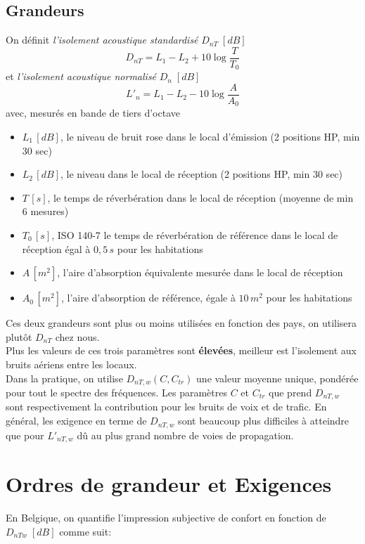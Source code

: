 \documentclass[11pt]{report}
\begin{document}
\subsection{Grandeurs}
On définit \textit{l'isolement acoustique standardisé} $D_{nT}\;[dB]$
$$D_{nT} = L_1 - L_2 + 10\log \frac{T}{T_0}$$
et \textit{l'isolement acoustique normalisé} $D_{n}\;[dB]$
$$L'_{n} = L_1 - L_2 - 10\log \frac{A}{A_0}$$
avec, mesurés en bande de tiers d'octave
\begin{itemize}
\item $L_1\,[dB]$, le niveau de bruit rose dans le local d'émission (2 positions HP, min 30 sec)
\item $L_2\,[dB]$, le niveau dans le local de réception (2 positions HP, min 30 sec)
\item $T\,[s]$, le temps de réverbération dans le local de réception (moyenne de min 6 mesures)
\item $T_0\,[s]$, ISO 140-7 le temps de réverbération de référence dans le local de réception égal à $0,5\,s$ pour les habitations
\item $A\,[m^2]$, l'aire d'absorption équivalente mesurée dans le local de réception
\item $A_0\,[m^2]$, l'aire d'absorption de référence, égale à $10\,m^2$ pour les habitations
\end{itemize}


Ces deux grandeurs sont plus ou moins utilisées en fonction des pays, on utilisera plutôt $D_{nT}$ chez nous. \\

Plus les valeurs de ces trois paramètres sont \textbf{élevées}, meilleur est l'isolement aux bruits aériens entre les locaux.\\

Dans la pratique, on utilise $D_{nT,w}(C,C_{tr})$ une valeur moyenne unique, pondérée  pour tout le spectre des fréquences. Les paramètres $C$ et $C_{tr}$ que prend $D_{nT,w}$ sont respectivement la contribution pour les bruits de voix et de trafic. En général, les exigence en terme de $D_{nT,w}$ sont beaucoup plus difficiles à atteindre que pour $L'_{nT,w}$ dû au plus grand nombre de voies de propagation.


\section{Ordres de grandeur et Exigences}
En Belgique, on quantifie l'impression subjective de confort en fonction de $D_{nTw}\; [dB]$ comme suit:
\end{document}
